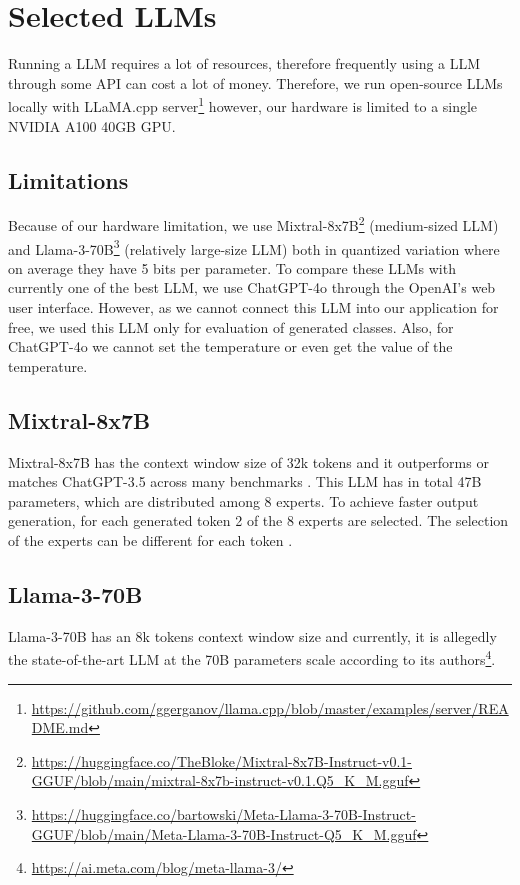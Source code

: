 \section{Selected LLMs}

Running a LLM requires a lot of resources, therefore frequently using a LLM through some API can cost a lot of money. Therefore, we run open-source LLMs locally with LLaMA.cpp server\footnote{\url{https://github.com/ggerganov/llama.cpp/blob/master/examples/server/README.md}} however, our hardware is limited to a single NVIDIA A100 40GB GPU.


\subsection{Limitations}

Because of our hardware limitation, we use Mixtral-8x7B\footnote{\url{https://huggingface.co/TheBloke/Mixtral-8x7B-Instruct-v0.1-GGUF/blob/main/mixtral-8x7b-instruct-v0.1.Q5_K_M.gguf}} (medium-sized LLM) \cite{Jiang2024} and Llama-3-70B\footnote{\url{https://huggingface.co/bartowski/Meta-Llama-3-70B-Instruct-GGUF/blob/main/Meta-Llama-3-70B-Instruct-Q5_K_M.gguf}} (relatively large-size LLM) both in quantized variation where on average they have 5 bits per parameter. To compare these LLMs with currently one of the best LLM, we use ChatGPT-4o through the OpenAI's web user interface. However, as we cannot connect this LLM into our application for free, we used this LLM only for evaluation of generated classes. Also, for ChatGPT-4o we cannot set the temperature or even get the value of the temperature.


\subsection{Mixtral-8x7B}

Mixtral-8x7B has the context window size of 32k tokens and it outperforms or matches ChatGPT-3.5 across many benchmarks \cite{Jiang2024}. This LLM has in total 47B parameters, which are distributed among 8 experts. To achieve faster output generation, for each generated token 2 of the 8 experts are selected. The selection of the experts can be different for each token \cite{Jiang2024}.


\subsection{Llama-3-70B}

Llama-3-70B has an 8k tokens context window size and currently, it is allegedly the state-of-the-art LLM at the 70B parameters scale according to its authors\footnote{\url{https://ai.meta.com/blog/meta-llama-3/}}.


